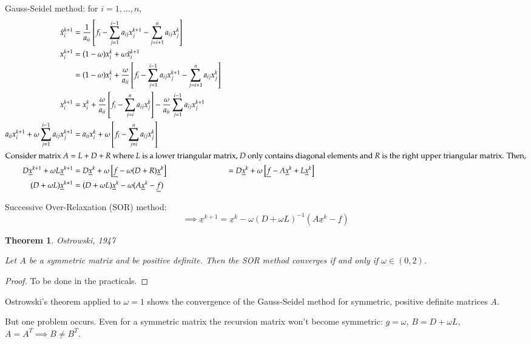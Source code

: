 \documentclass{article}
\newtheorem{theorem}{Theorem}
\begin{document}
Gauss-Seidel method: for $i = 1, \ldots, n$,
\begin{align*}
  \hat x_i^{k+1} &= \frac{1}{a_{ii}} \left[f_i - \sum_{j=1}^{i-1} a_{ij} x_j^{k+1} - \sum_{j=i+1}^n a_{ij} x_j^k\right] \\
  x_i^{k+1} &= (1 - \omega) x_i^k + \omega \hat x_i^{k+1} \\
            &= (1 - \omega) x_i^k + \frac{\omega}{a_{ii}} \left[ f_i - \sum_{j=1}^{i-1} a_{ij} x_j^{k+1} - \sum_{j=i+1}^n a_{ij} x_j^k\right] \\
  x_i^{k+1} &= x_i^k + \frac{\omega}{a_{ii}} \left[f_i - \sum_{j=i}^n a_{ij} x_j^k\right] - \frac{\omega}{a_{ii}} \sum_{j=1}^{i-1} a_{ij} x_j^{k+1} \\
  a_{ii} x_i^{k+1} + \omega \sum_{j=1}^{i-1} a_{ij} x_j^{k+1} &= a_{ii} x_i^k + \omega \left[f_i - \sum_{j=i}^n a_{ij} x_j^k\right] \\
\intertext{Consider matrix $A = L + D + R$ where $L$ is a lower triangular matrix, $D$ only contains diagonal elements and $R$ is the right upper triangular matrix. Then,}
  D \underline{x}^{k+1} + \omega L \underline{x}^{k+1} &= D \underline{x}^k + \omega \left[\underline{f} - \omega (D + R) \underline{x}^k\right]
    &= D \underline{x}^k + \omega \left[ \underline{f} - A \underline{x}^k + L \underline{x}^k \right] \\
  (D + \omega L) \underline{x}^{k+1} &= (D + \omega L) \underline{x}^k - \omega (A \underline{x}^k - \underline{f})
\end{align*}

Successive Over-Relaxation (SOR) method:
\[ \implies \underline{x}^{k+1} = \underline{x}^k - \omega (D + \omega L)^{-1} (A \underline{x}^k - \underline{f}) \]

\begin{theorem}
  Ostrowski, 1947

  Let $A$ be a symmetric matrix and be positive definite. Then the SOR method converges
  if and only if $\omega \in (0,2)$.
\end{theorem}
\begin{proof}
  To be done in the practicals.
\end{proof}

Ostrowski's theorem applied to $\omega=1$ shows the convergence of the Gauss-Seidel method for symmetric, positive definite matrices $A$.

But one problem occurs.
Even for a symmetric matrix the recursion matrix won't become symmetric:
$g = \omega$, $B = D + \omega L$, $A = A^T \implies B \neq B^T$.
\end{document}
